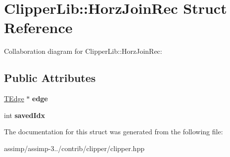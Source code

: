 \hypertarget{struct_clipper_lib_1_1_horz_join_rec}{\section{Clipper\+Lib\+:\+:Horz\+Join\+Rec Struct Reference}
\label{struct_clipper_lib_1_1_horz_join_rec}
}


Collaboration diagram for Clipper\+Lib\+:\+:Horz\+Join\+Rec\+:
\subsection*{Public Attributes}
\begin{DoxyCompactItemize}
\item 
\hypertarget{struct_clipper_lib_1_1_horz_join_rec_a610c6cf1e5edfc418da0965c3f68a8b8}{\hyperlink{struct_clipper_lib_1_1_t_edge}{T\+Edge} $\ast$ {\bfseries edge}}\label{struct_clipper_lib_1_1_horz_join_rec_a610c6cf1e5edfc418da0965c3f68a8b8}

\item 
\hypertarget{struct_clipper_lib_1_1_horz_join_rec_a58dada80e24143e14c71458340099b14}{int {\bfseries saved\+Idx}}\label{struct_clipper_lib_1_1_horz_join_rec_a58dada80e24143e14c71458340099b14}

\end{DoxyCompactItemize}


The documentation for this struct was generated from the following file\+:\begin{DoxyCompactItemize}
\item 
assimp/assimp-\/3../contrib/clipper/clipper.\+hpp\end{DoxyCompactItemize}
